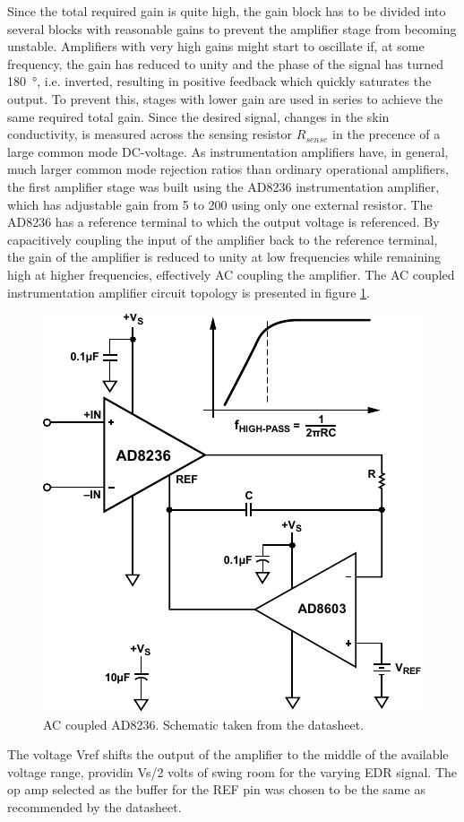 \documentclass[a4paper,11pt]{article}
\begin{document}
Since the total required gain is quite high, the gain block has to be
divided into several blocks with reasonable gains to prevent the
amplifier stage from becoming unstable. Amplifiers with very high
gains might start to oscillate if, at some frequency, the gain has
reduced to unity and the phase of the signal has turned
\SI{180}{\degree}, i.e. inverted, resulting in positive feedback which
quickly saturates the output. To prevent this, stages with lower gain
are used in series to achieve the same required total gain. Since the
desired signal, changes in the skin conductivity, is measured across
the sensing resistor $R_{sense}$ in the precence of a large common
mode DC-voltage. As instrumentation amplifiers have, in general, much
larger common mode rejection ratios than ordinary operational
amplifiers, the first amplifier stage was built using the AD8236
instrumentation amplifier, which has adjustable gain from 5 to 200
using only one external resistor. The AD8236 has a reference terminal
to which the output voltage is referenced. By capacitively coupling
the input of the amplifier back to the reference terminal, the gain of
the amplifier is reduced to unity at low frequencies while remaining
high at higher frequencies, effectively AC coupling the amplifier. The
AC coupled instrumentation amplifier circuit topology is presented in
figure \ref{fig:ina-ac-coupled}.
\begin{figure}[htb]   
  \caption{AC coupled AD8236. Schematic taken from the datasheet.}
  \label{fig:ina-ac-coupled}
  \includegraphics[width=\linewidth]{ina-ac-coupled}
\end{figure}
The voltage Vref shifts the output of the amplifier to the middle of
the available voltage range, providin Vs/2 volts of swing room for the
varying EDR signal. The op amp selected as the buffer for the REF pin
was chosen to be the same as recommended by the datasheet.
\end{document}
